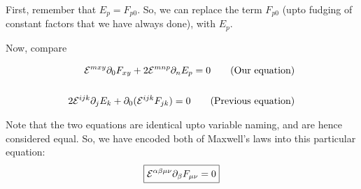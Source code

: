 First, remember that $E_p = F_{p 0}$. So, we can replace the term $F_{p 0}$
(upto fudging of constant factors that we have always done), with $E_p$.

Now, compare

\begin{align*}
    \mathcal{E}^{m x y}  \partial_{0} F_{x y} + 
    2 \mathcal{E}^{m n p}   \partial_{n} E_p = 0 \tag{Our equation} \\
    \\
    2\mathcal{E}^{ijk} \partial_j E_k  + \partial_0 (\mathcal{E}^{ijk} F_{jk})  = 0 \tag{Previous equation} \\
\end{align*}

Note that the two equations are identical upto variable naming, and are
hence considered equal. So, we have encoded both of Maxwell's
laws into this particular equation:
\begin{equation}
    \boxed{\mathcal{E}^{\alpha \beta \mu \nu}  \partial_{\beta} F_{\mu \nu} = 0}
\end{equation}
